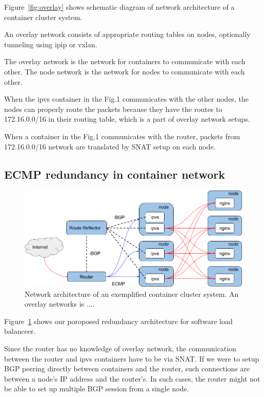 Figure~\ref{fig:overlay} shows schematic diagram of network architecture of a container cluster system. 

An overlay network consists of appropriate routing tables on nodes, optionally tunneling using ipip or vxlan.
 
The overlay network is the network for containers to communicate with each other. The node network is the network for nodes to communicate with each other.

When the ipvs container in the Fig.1 communicates with the other nodes, the nodes can properly route the packets because they have the routes to 172.16.0.0/16 in their routing table, which is a part of overlay network setups.

When a container in the Fig.1 communicates with the router, packets from 172.16.0.0/16 network are translated by SNAT setup on each node.

\subsection{ECMP redundancy in container network}
 
\begin{figure}
\includegraphics[width=\columnwidth]{Figs/ecmp.png}
\caption{Network architecture of an exemplified container cluster system. An overlay networks is .... }
\label{fig:ecmp}
\end{figure}

Figure~\ref{fig:ecmp} shows our poroposed redundancy architecture for software load balanceer.

Since the router has no knowledge of overlay network, the communication between the router and ipvs containers have to be via SNAT.
If we were to setup BGP peering directly between containers and the router, such connections are between a node’s IP address and the router’s. 
In such cases, the router might not be able to set up multiple BGP session from a single node.

